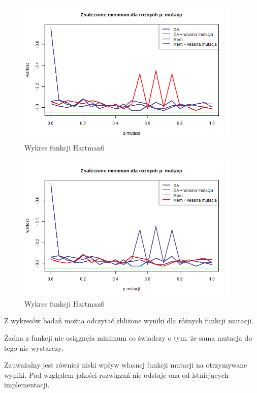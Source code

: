 \documentclass[11pt, a4paper]{article}
\newcommand{\fbi}{\leavevmode{\parindent=1em\indent}}
\begin{document}
\begin{figure}[H]
	\centering
	\includegraphics[width=0.95\textwidth]{./assets/Hartman6mut3.png}
	\caption{Wykres funkcji Hartman6}
	\label{fig:Hartman6mut3}
\end{figure}

\begin{figure}[H]
	\centering
	\includegraphics[width=0.95\textwidth]{./assets/Hartman6mut4.png}
	\caption{Wykres funkcji Hartman6}
	\label{fig:Hartman6mut4}
\end{figure}

\fbi
Z wykresów badań można odczytać zbliżone wyniki dla różnych funkcji mutacji.

\fbi
Żadna z funkcji nie osiągnęła minimum co świadczy o tym, że sama mutacja do tego nie wystarczy.

\fbi
Zauważalny jest również niski wpływ własnej funkcji mutacji na otrzymywane wyniki. Pod względem jakości rozwiązań nie odstaje ona od istniejących implementacji.
\end{document}
